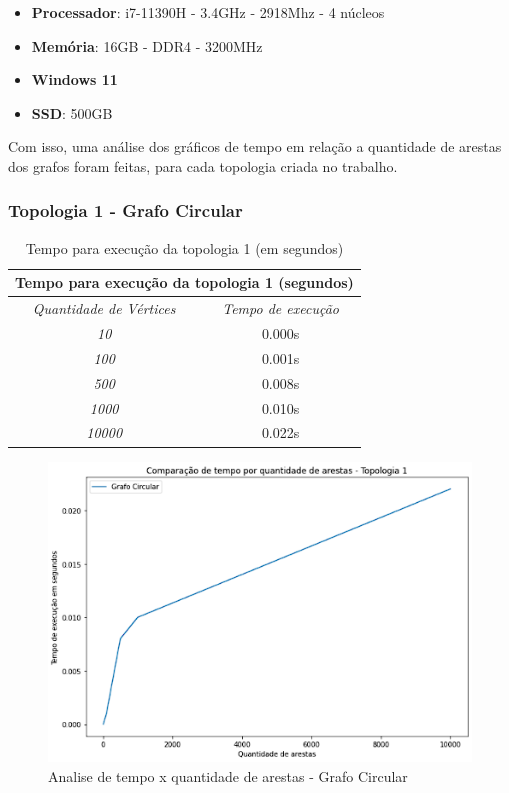 \begin{itemize}
  \item \textbf{Processador}: i7-11390H - 3.4GHz - 2918Mhz - 4 núcleos 
  \item \textbf{Memória}: 16GB - DDR4 - 3200MHz
  \item \textbf{Windows 11}
  \item \textbf{SSD}: 500GB
\end{itemize}

Com isso, uma análise dos gráficos de tempo em relação a quantidade de arestas dos grafos foram feitas, para cada topologia criada no trabalho.

\subsubsection{Topologia 1 - Grafo Circular}

\begin{center}
\begin{table}[ht]
    \centering
    \begin{tabular}{|c | c |}
     \hline
        \multicolumn{2}{|c|}{\textbf{Tempo para execução da topologia 1 (segundos)}} \\
     \hline
         \emph{Quantidade de Vértices} & \emph{Tempo de execução}\\ [0.5ex] 
     \hline
         \emph{10} & 0.000s \\ 
     \hline
         \emph{100} & 0.001s \\
     \hline
         \emph{500} & 0.008s \\
     \hline
         \emph{1000} & 0.010s \\
     \hline
         \emph{10000} & 0.022s\\
     \hline
    \end{tabular}
    \caption{Tempo para execução da topologia 1 (em segundos)}
    \label{tab:tabela_topologia_1}
\end{table}
\end{center}

\begin{figure}[H]
    \centering
    \includegraphics[width=.6\textwidth]{figuras/circular.png}
    \caption{Analise de tempo x quantidade de arestas - Grafo Circular}
    \label{fig:figure20}
\end{figure}

